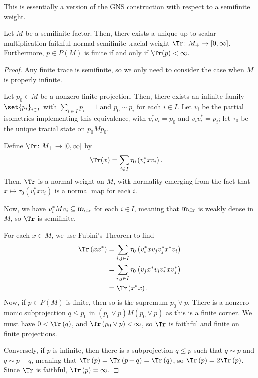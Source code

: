 \documentclass[10pt]{mypackage}
\begin{document}
This is essentially a version of the GNS construction with respect to a semifinite weight.
\begin{theorem}
  Let $M$ be a semifinite factor. Then, there exists a unique up to scalar multiplication faithful normal semifinite tracial weight $\Tr\colon M_{+}\rightarrow [0,\infty]$. Furthermore, $p\in P(M)$ is finite if and only if $\Tr(p) < \infty$.
\end{theorem}
\begin{proof}
  Any finite trace is semifinite, so we only need to consider the case when $M$ is properly infinite.

  Let $p_0\in M$ be a nonzero finite projection. Then, there exists an infinite family $\set{p_i}_{i\in I}$ with $\sum_{i\in I}p_i = 1$ and $p_0\sim p_i$ for each $i\in I$. Let $v_i$ be the partial isometries implementing this equivalence, with $v_i^{\ast}v_i = p_0$ and $v_iv_i^{\ast} = p_i$; let $\tau_0$ be the unique tracial state on $p_0Mp_0$.

  Define $\Tr\colon M_{+}\rightarrow [0,\infty]$ by
  \begin{align*}
    \Tr(x) &= \sum_{i\in I} \tau_0\left( v_i^{\ast}xv_i \right).
  \end{align*}
  Then, $\Tr$ is a normal weight on $M$, with normality emerging from the fact that $x\mapsto \tau_0\left( v_i^{\ast}xv_i \right)$ is a normal map for each $i$.

  Now, we have $v_i^{\ast}Mv_i\subseteq \mathfrak{m}_{\Tr}$ for each $i\in I$, meaning that $\mathfrak{m}_{\Tr}$ is weakly dense in $M$, so $\Tr$ is semifinite.

  For each $x\in M$, we use Fubini's Theorem to find
  \begin{align*}
    \Tr\left( xx^{\ast} \right) &= \sum_{i,j\in I} \tau_0\left( v_i^{\ast}xv_jv_j^{\ast}x^{\ast}v_i \right)\\
                                &= \sum_{i,j\in I}\tau_0\left( v_jx^{\ast}v_iv_i^{\ast}xv_j^{\ast} \right)\\
                                &= \Tr\left( x^{\ast}x \right).
  \end{align*}
  Now, if $p\in P(M)$ is finite, then so is the supremum $p_0\vee p$. There is a nonzero monic subprojection $q\leq p_0$ in $\left( p_0\vee p \right)M \left( p_0\vee p \right)$ as this is a finite corner. We must have $0 < \Tr\left( q \right)$, and $\Tr\left( p_0\vee p \right) < \infty$, so $\Tr$ is faithful and finite on finite projections.

  Conversely, if $p$ is infinite, then there is a subprojection $q\leq p$ such that $q\sim p$ and $q\sim p-q$, meaning that $\Tr\left( p \right) = \Tr\left( p-q \right) = \Tr\left( q \right)$, so $\Tr\left( p \right) = 2\Tr\left( p \right)$. Since $\Tr$ is faithful, $\Tr\left( p \right) = \infty$.


\end{proof}
\end{document}
